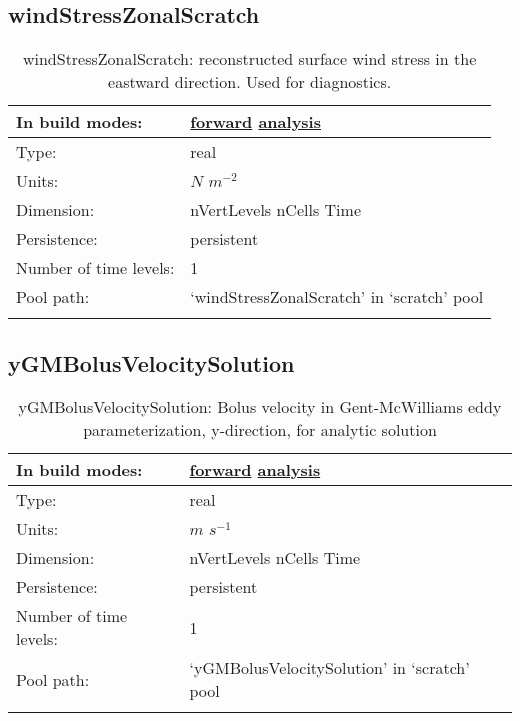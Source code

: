 \subsection[windStressZonalScratch]{windStressZonalScratch}
\label{subsec:var_sec_scratch_windStressZonalScratch}
\begin{center}
\begin{longtable}{| p{2.0in} | p{4.0in} |}
        \hline 
        In build modes: & \hyperref[subsec:forward_var_tab_scratch]{forward} \hyperref[subsec:analysis_var_tab_scratch]{analysis} \\
        \hline 
        Type: & real \\
        \hline 
        Units: & $N$ $m^{-2}$ \\
        \hline 
        Dimension: & nVertLevels nCells Time \\
        \hline 
        Persistence: & persistent \\
        \hline 
        Number of time levels: & 1 \\
        \hline 
            Pool path: & `windStressZonalScratch' in `scratch' pool \\
		 \hline 
    \caption{windStressZonalScratch: reconstructed surface wind stress in the eastward direction. Used for diagnostics.}
\end{longtable}
\end{center}
\subsection[yGMBolusVelocitySolution]{yGMBolusVelocitySolution}
\label{subsec:var_sec_scratch_yGMBolusVelocitySolution}
\begin{center}
\begin{longtable}{| p{2.0in} | p{4.0in} |}
        \hline 
        In build modes: & \hyperref[subsec:forward_var_tab_scratch]{forward} \hyperref[subsec:analysis_var_tab_scratch]{analysis} \\
        \hline 
        Type: & real \\
        \hline 
        Units: & $m$ $s^{-1}$ \\
        \hline 
        Dimension: & nVertLevels nCells Time \\
        \hline 
        Persistence: & persistent \\
        \hline 
        Number of time levels: & 1 \\
        \hline 
            Pool path: & `yGMBolusVelocitySolution' in `scratch' pool \\
		 \hline 
    \caption{yGMBolusVelocitySolution: Bolus velocity in Gent-McWilliams eddy parameterization, y-direction, for analytic solution}
\end{longtable}
\end{center}
